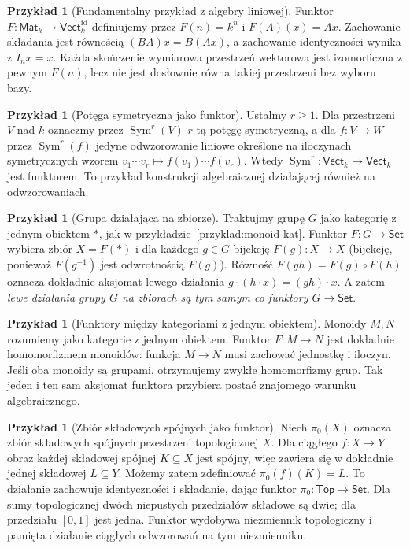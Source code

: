 \documentclass[11pt,a4paper]{article}
\numberwithin{equation}{section}
\theoremstyle{plain}
\theoremstyle{definition}
\newtheorem{przyklad}[twierdzenie]{Przykład}
\theoremstyle{remark}
\newcommand{\cat}[1]{\mathsf{#1}}
\newcommand{\Set}{\cat{Set}}
\newcommand{\Top}{\cat{Top}}
\newcommand{\Vect}{\cat{Vect}}
\begin{document}
\begin{przyklad}[Fundamentalny przykład z algebry liniowej]
Funktor $F:\cat{Mat}_k\to\Vect_k^{\mathrm{fd}}$ definiujemy przez $F(n)=k^n$ i $F(A)(x)=Ax$. Zachowanie składania jest równością $(BA)x=B(Ax)$, a zachowanie identyczności wynika z $I_nx=x$. Każda skończenie wymiarowa przestrzeń wektorowa jest izomorficzna z pewnym $F(n)$, lecz nie jest dosłownie równa takiej przestrzeni bez wyboru bazy.
\end{przyklad}

\begin{przyklad}[Potęga symetryczna jako funktor]
Ustalmy $r\geq1$. Dla przestrzeni $V$ nad $k$ oznaczmy przez $\operatorname{Sym}^r(V)$ $r$-tą potęgę symetryczną, a dla $f:V\to W$ przez $\operatorname{Sym}^r(f)$ jedyne odwzorowanie liniowe określone na iloczynach symetrycznych wzorem $v_1\cdots v_r\mapsto f(v_1)\cdots f(v_r)$. Wtedy $\operatorname{Sym}^r:\Vect_k\to\Vect_k$ jest funktorem. To przykład konstrukcji algebraicznej działającej również na odwzorowaniach.
\end{przyklad}

\begin{przyklad}[Grupa działająca na zbiorze]\label{przyklad:dzialanie-funktor}
Traktujmy grupę $G$ jako kategorię z jednym obiektem $*$, jak w przykładzie~\ref{przyklad:monoid-kat}. Funktor $F:G\to\Set$ wybiera zbiór $X=F(*)$ i dla każdego $g\in G$ bijekcję $F(g):X\to X$ (bijekcję, ponieważ $F(g^{-1})$ jest odwrotnością $F(g)$). Równość $F(gh)=F(g)\circ F(h)$ oznacza dokładnie aksjomat lewego działania $g\cdot(h\cdot x)=(gh)\cdot x$. A zatem \emph{lewe działania grupy $G$ na zbiorach są tym samym co funktory $G\to\Set$}.
\end{przyklad}

\begin{przyklad}[Funktory między kategoriami z jednym obiektem]
Monoidy $M,N$ rozumiemy jako kategorie z jednym obiektem. Funktor $F:M\to N$ jest dokładnie homomorfizmem monoidów: funkcja $M\to N$ musi zachować jednostkę i iloczyn. Jeśli oba monoidy są grupami, otrzymujemy zwykłe homomorfizmy grup. Tak jeden i ten sam aksjomat funktora przybiera postać znajomego warunku algebraicznego.
\end{przyklad}


\begin{przyklad}[Zbiór składowych spójnych jako funktor]
Niech $\pi_0(X)$ oznacza zbiór składowych spójnych przestrzeni topologicznej $X$. Dla ciągłego $f:X\to Y$ obraz każdej składowej spójnej $K\subseteq X$ jest spójny, więc zawiera się w dokładnie jednej składowej $L\subseteq Y$. Możemy zatem zdefiniować $\pi_0(f)(K)=L$. To działanie zachowuje identyczności i składanie, dając funktor $\pi_0:\Top\to\Set$. Dla sumy topologicznej dwóch niepustych przedziałów składowe są dwie; dla przedziału $[0,1]$ jest jedna. Funktor wydobywa niezmiennik topologiczny i pamięta działanie ciągłych odwzorowań na tym niezmienniku.
\end{przyklad}
\end{document}
